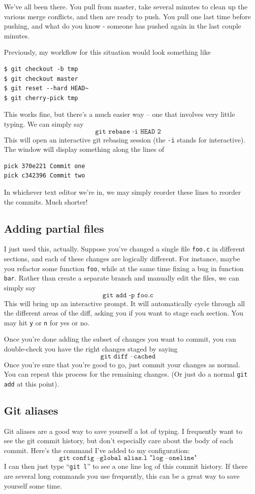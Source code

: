 \documentclass[12pt]{report}
\begin{document}
We've all been there. You pull from master, take several minutes to
clean up the various merge conflicts, and then are ready to push. You
pull one last time before pushing, and what do you know - someone has
pushed again in the last couple minutes.

Previously, my workflow for this situation would look something like
\begin{verbatim}
$ git checkout -b tmp
$ git checkout master
$ git reset --hard HEAD~
$ git cherry-pick tmp
\end{verbatim}

This works fine, but there’s a much easier way -- one that involves
very little typing. We can simply say
\[
  \texttt{git rebase -i HEAD~2}
\]
This will open an interactive git rebasing session (the \texttt{-i}
stands for interactive). The window will display something along the
lines of
\begin{verbatim}
pick 370e221 Commit one
pick c342396 Commit two
\end{verbatim}
In whichever text editor we’re in, we may simply reorder these lines
to reorder the commits. Much shorter!

\subsection{Adding partial files}
I just used this, actually. Suppose you’ve changed a single file
\texttt{foo.c} in different sections, and each of these changes are
logically different. For instance, maybe you refactor some function
\texttt{foo}, while at the same time fixing a bug in function
\texttt{bar}. Rather than create a separate branch and manually edit
the files, we can simply say
\[
  \texttt{git add -p foo.c}
\]
This will bring up an interactive prompt. It will automatically cycle
through all the different areas of the diff, asking you if you want to
stage each section. You may hit \texttt{y} or \texttt{n} for yes or
no.

Once you’re done adding the subset of changes you want to commit, you
can double-check you have the right changes staged by saying
\[
  \texttt{git diff --cached}
\]
Once you’re sure that you’re good to go, just commit your changes as
normal. You can repeat this process for the remaining changes. (Or
just do a normal \texttt{git add} at this point).

\subsection{Git aliases}
Git aliases are a good way to save yourself a lot of typing. I
frequently want to see the git commit history, but don’t especially
care about the body of each commit. Here’s the command I’ve added to
my configuration:
\[
  \texttt{git config --global alias.l "log --oneline"}
\]
I can then just type “\texttt{git l}” to see a one line log of this
commit history. If there are several long commands you use frequently,
this can be a great way to save yourself some time.
\end{document}
